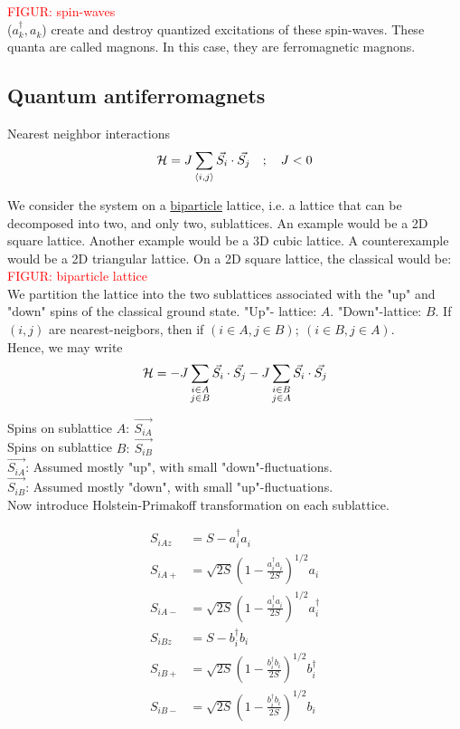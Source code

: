 \textcolor{red}{FIGUR: spin-waves} \\

($a_k^\dagger, a_k^{}$) create and destroy quantized excitations of these spin-waves. These quanta are called magnons. In this case, they are ferromagnetic magnons.

\subsection{Quantum antiferromagnets}

Nearest neighbor interactions
\begin{equation}
    \mathcal{H} = J \sum_{\langle i, j \rangle}\Vec{S_i}\cdot\Vec{S_j} \quad ; \quad J < 0
\end{equation}

We consider the system on a \uline{biparticle} lattice, i.e. a lattice that can be decomposed into two, and only two, sublattices. An example would be a 2D square lattice. Another example would be a 3D cubic lattice. A counterexample would be a 2D triangular lattice. On a 2D square lattice, the classical would be:\\

\textcolor{red}{FIGUR: biparticle lattice} \\

We partition the lattice into the two sublattices associated with the "up" and "down" spins of the classical ground state. "Up"- lattice: $A$. "Down"-lattice: $B$. If $(i, j)$ are nearest-neigbors, then if $(i \in A, j \in B); \ (i \in B, j \in A)$. \\
 Hence, we may write
\begin{equation}
    \mathcal{H} = - J \sum_{\substack{i \in A \\ j \in B}} \Vec{S_i} \cdot \Vec{S_j} - J \sum_{\substack{i \in B \\ j \in A}} \Vec{S_i} \cdot \Vec{S_j}
\end{equation}

Spins on sublattice $A: \ \Vec{S_{iA}}$ \\
Spins on sublattice $B: \ \Vec{S_{iB}}$ \\
$\Vec{S_{iA}}$: Assumed mostly "up", with small "down"-fluctuations. \\
$\Vec{S_{iB}}$: Assumed mostly "down", with small "up"-fluctuations. \\

Now introduce Holstein-Primakoff transformation on each sublattice.

\begin{align}
    S_{iAz} &= S - a_i^\dagger a_i^{} \\
    S_{iA+} &= \sqrt{2S} (1- \frac{a_i^\dagger a_i^{}}{2S})^{1/2} a_i \\
    S_{iA-} &= \sqrt{2S} (1- \frac{a_i^\dagger a_i^{}}{2S})^{1/2} a_i^\dagger \\
    S_{iBz} &= S - b_i^\dagger b_i^{} \\
    S_{iB+} &= \sqrt{2S} (1- \frac{b_i^\dagger b_i^{}}{2S})^{1/2} b_i^\dagger \\
    S_{iB-} &= \sqrt{2S} (1- \frac{b_i^\dagger b_i^{}}{2S})^{1/2} b_i \\
\end{align}

